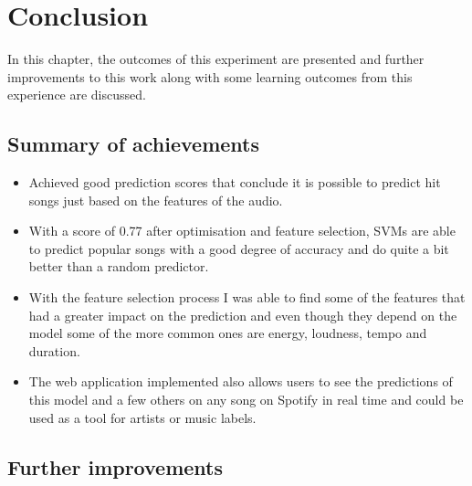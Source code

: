 \chapter{Conclusion}

In this chapter, the outcomes of this experiment are presented and further improvements to this work along with some learning outcomes from this experience are discussed.

\section{Summary of achievements}
\begin{itemize}
\item Achieved good prediction scores that conclude it is possible to predict hit songs just based on the features of the audio.
\item With a score of 0.77 after optimisation and feature selection, SVMs are able to predict popular songs with a good degree of accuracy and do quite a bit better than a random predictor.
\item With the feature selection process I was able to find some of the features that had a greater impact on the prediction and even though they depend on the model some of the more common ones are energy, loudness, tempo and duration.
\item The web application implemented also allows users to see the predictions of this model and a few others on any song on Spotify in real time and could be used as a tool for artists or music labels.
\end{itemize}


\section{Further improvements}

